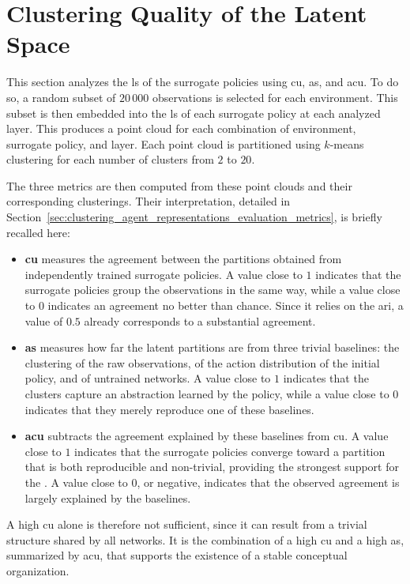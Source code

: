 \section{Clustering Quality of the Latent Space}
\label{sec:experiments_clustering_quality_of_the_latent_space}

This section analyzes the \gls{ls} of the surrogate policies using \gls{cu}, \gls{as}, and \gls{acu}.
To do so, a random subset of $20\,000$ observations is selected for each environment.
This subset is then embedded into the \gls{ls} of each surrogate policy at each analyzed layer.
This produces a point cloud for each combination of environment, surrogate policy, and layer.
Each point cloud is partitioned using $k$-means clustering \parencite{macqueen1967multivariate} for each number of clusters from $2$ to $20$.

The three metrics are then computed from these point clouds and their corresponding clusterings.
Their interpretation, detailed in Section~\ref{sec:clustering_agent_representations_evaluation_metrics}, is briefly recalled here:
\begin{itemize}
    \item \textbf{\gls{cu}} measures the agreement between the partitions obtained from independently trained surrogate policies.
    A value close to $1$ indicates that the surrogate policies group the observations in the same way, while a value close to $0$ indicates an agreement no better than chance.
    Since it relies on the \gls{ari}, a value of $0.5$ already corresponds to a substantial agreement.
    \item \textbf{\gls{as}} measures how far the latent partitions are from three trivial baselines: the clustering of the raw observations, of the action distribution of the initial policy, and of untrained networks.
    A value close to $1$ indicates that the clusters capture an abstraction learned by the policy, while a value close to $0$ indicates that they merely reproduce one of these baselines.
    \item \textbf{\gls{acu}} subtracts the agreement explained by these baselines from \gls{cu}.
    A value close to $1$ indicates that the surrogate policies converge toward a partition that is both reproducible and non-trivial, providing the strongest support for the \RepresentationConvergenceHypothesisName.
    A value close to $0$, or negative, indicates that the observed agreement is largely explained by the baselines.
\end{itemize}
A high \gls{cu} alone is therefore not sufficient, since it can result from a trivial structure shared by all networks.
It is the combination of a high \gls{cu} and a high \gls{as}, summarized by \gls{acu}, that supports the existence of a stable conceptual organization.

